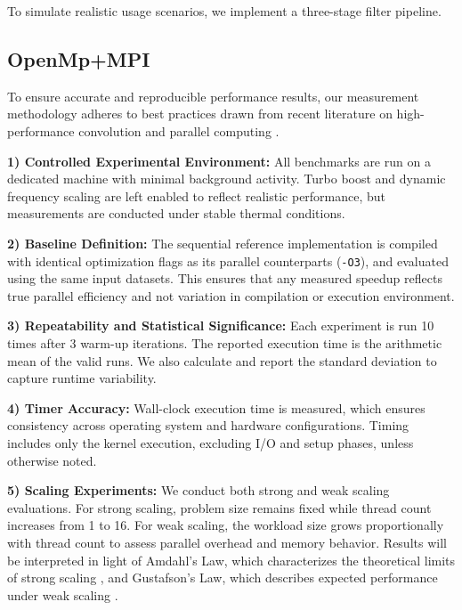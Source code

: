 \documentclass[conference, 10pt]{IEEEtran}
\begin{document}
To simulate realistic usage scenarios, we implement a three-stage filter pipeline.



\subsection{\textbf{OpenMp+MPI}}

To ensure accurate and reproducible performance results, our measurement methodology adheres to best practices drawn from recent literature on high-performance convolution and parallel computing \cite{Gawrych2023,  Rajput2013,  Yoon2012}.

\vspace{0.5em}
\textbf{1) Controlled Experimental Environment:} All benchmarks are run on a dedicated machine with minimal background activity. Turbo boost and dynamic frequency scaling are left enabled to reflect realistic performance, but measurements are conducted under stable thermal conditions.

\vspace{0.5em}
\textbf{2) Baseline Definition:} The sequential reference implementation is compiled with identical optimization flags as its parallel counterparts (\texttt{-O3}), and evaluated using the same input datasets. This ensures that any measured speedup reflects true parallel efficiency and not variation in compilation or execution environment.

\vspace{0.5em}
\textbf{3) Repeatability and Statistical Significance:} Each experiment is run 10 times after 3 warm-up iterations. The reported execution time is the arithmetic mean of the valid runs. We also calculate and report the standard deviation to capture runtime variability.

\vspace{0.5em}
\textbf{4) Timer Accuracy:} Wall-clock execution time is measured, which ensures consistency across operating system and hardware configurations. Timing includes only the kernel execution, excluding I/O and setup phases, unless otherwise noted.

\vspace{0.5em}
\textbf{5) Scaling Experiments:} 
We conduct both strong and weak scaling evaluations. For strong scaling, problem size remains fixed while thread count increases from 1 to 16. For weak scaling, the workload size grows proportionally with thread count to assess parallel overhead and memory behavior. Results will be interpreted in light of Amdahl’s Law, which characterizes the theoretical limits of strong scaling \cite{hager2021hpc}, and Gustafson’s Law, which describes expected performance under weak scaling \cite{Gustafson1988}.
\end{document}
